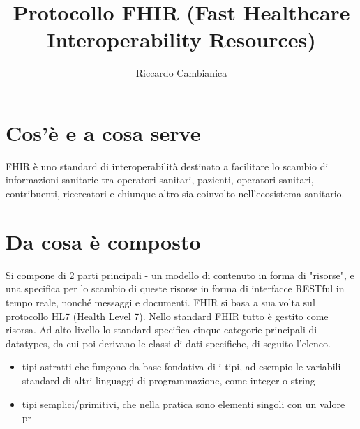 \documentclass{article}
\title{Protocollo FHIR (Fast Healthcare Interoperability Resources)}
\author{Riccardo Cambianica}
\begin{document}
    \maketitle
    \newpage
    \tableofcontents
    \newpage
    
    \section{Cos'è e a cosa serve}
    FHIR è uno standard di interoperabilità destinato a facilitare lo scambio di informazioni sanitarie tra operatori sanitari, pazienti, operatori sanitari, contribuenti, ricercatori e chiunque altro sia coinvolto nell'ecosistema sanitario.
    
    \section{Da cosa è composto}
         Si compone di 2 parti principali - un modello di contenuto in forma di "risorse", e una specifica per lo scambio di queste risorse in forma di interfacce RESTful in tempo reale, nonché messaggi e documenti. FHIR si basa a sua volta sul protocollo HL7 (Health Level 7). 
        Nello standard FHIR tutto è gestito come risorsa. Ad alto livello lo standard specifica cinque categorie principali di datatypes, da cui poi derivano le classi di dati specifiche, di seguito l'elenco.
        \begin{itemize}
            \item tipi astratti che fungono da base fondativa di i tipi, ad esempio le variabili standard di altri linguaggi di programmazione, come integer o string
            \item tipi semplici/primitivi, che nella pratica sono elementi singoli con un valore pr
        \end{itemize}
    
\end{document}
